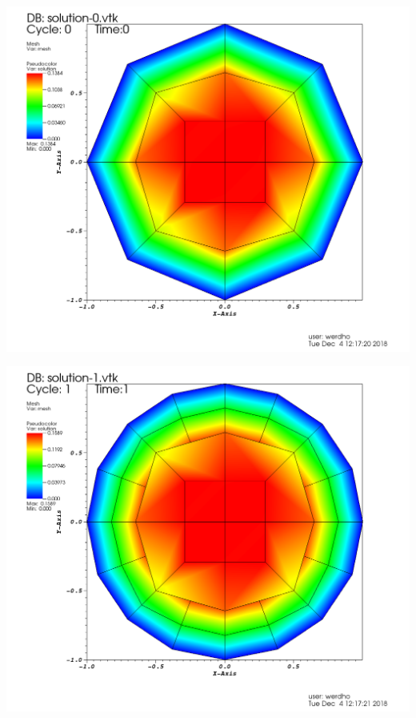 \documentclass[9pt]{beamer}
\begin{document}
\begin{frame}
\begin{minipage}{.45\paperwidth}
	\centering
	\includegraphics[scale=.12]{solu-4-1.png}
\end{minipage}%
\begin{minipage}{.4\paperwidth}
	\centering
	\includegraphics[scale=.12]{solu-4-2.png}
\end{minipage}
\begin{minipage}{.45\paperwidth}
	\centering

\end{minipage}
\end{frame}
\end{document}
